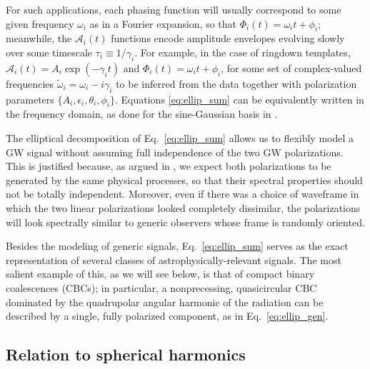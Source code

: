 \documentclass[aps,prd,twocolumn,superscriptaddress,preprintnumbers,floatfix,nofootinbib]{revtex4-2}
\newcommand*{\eq}[1]{Eq.~\eqref{eq:#1}}
\begin{document}
For such applications, each phasing function will usually correspond to some given frequency $\omega_i$ as in a Fourier expansion, so that $\Phi_i(t) = \omega_i t + \phi_i$; meanwhile, the $\mathcal{A}_i(t)$ functions encode amplitude envelopes evolving slowly over some timescale $\tau_i \equiv 1/\gamma_i$.
For example, in the case of ringdown templates, $\mathcal{A}_i(t) = A_i \exp(-\gamma_i t)$ and $\Phi_i(t) = \omega_i t + \phi_i$, for some set of complex-valued frequencies $\tilde{\omega}_i = \omega_i - i\gamma_i$ to be inferred from the data together with polarization parameters $\{ A_i, \epsilon_i, \theta_i, \phi_i\}$.
Equations \eqref{eq:ellip_sum} can be equivalently written in the frequency domain, as done for the sine-Gaussian basis in \cite{Cornish:2014kda,Cornish:2020dwh}.

The elliptical decomposition of Eq.~\eqref{eq:ellip_sum} allows us to flexibly model a GW signal without assuming full independence of the two GW polarizations.
This is justified because, as argued in \cite{Chatziioannou:2021mij}, we expect both polarizations to be generated by the same physical processes, so that their spectral properties should not be totally independent.
Moreover, even if there was a choice of waveframe in which the two linear polarizations looked completely dissimilar, the polarizations will look spectrally similar to generic observers whose frame is randomly oriented.

Besides the modeling of generic signals, \eq{ellip_sum} serves as the exact representation of several classes of astrophysically-relevant signals.
The most salient example of this, as we will see below, is that of compact binary coalescences (CBCs); in particular, a nonprecessing, quasicircular CBC dominated by the quadrupolar angular harmonic of the radiation can be described by a single, fully polarized component, as in \eq{ellip_gen}.



\subsection{Relation to spherical harmonics}
\label{sec:harmonics}
\end{document}
